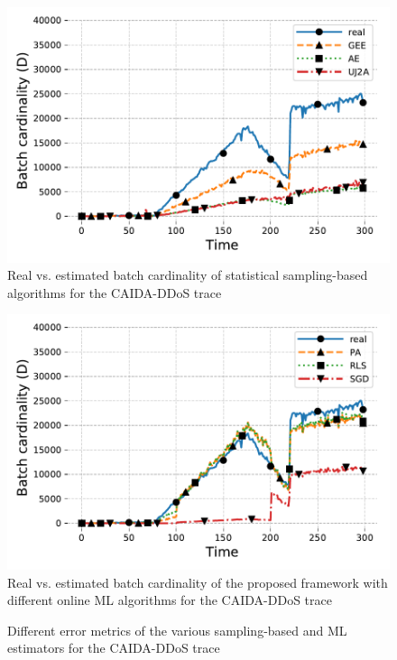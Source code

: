 		\begin{figure}[!tb]
			\centering
			\includegraphics[width=.95\linewidth]{img/caida-ddos_sampling_paper.pdf}
			\caption{Real vs. estimated batch cardinality of statistical sampling-based algorithms for the CAIDA-DDoS trace}
			\label{fig:caida-ddos_statistical}
		\end{figure}
		
		\begin{figure}[!tb]
			\centering
			\includegraphics[width=.95\linewidth]{img/caida-ddos_online_ml_paper.pdf}
			\caption{Real vs. estimated batch cardinality of the proposed framework with different online ML algorithms for the CAIDA-DDoS trace}
			\label{fig:caida-ddos_online_ml}
		\end{figure}

		\begin{figure}
			\centering
			\small
			
			\caption{Different error metrics of the various sampling-based and ML estimators for the CAIDA-DDoS trace}
			\label{fig:caida-ddos_error}
		\end{figure}
		
